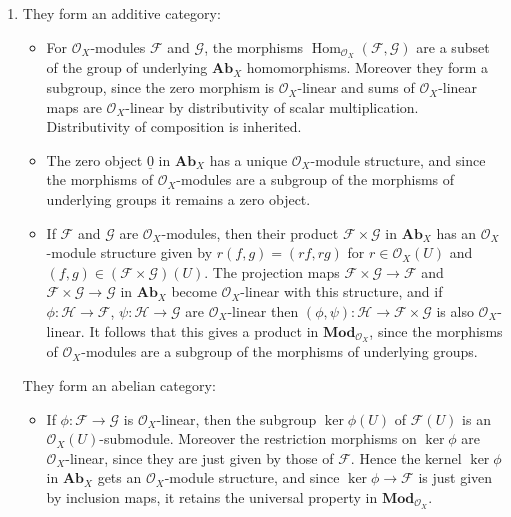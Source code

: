 \documentclass{report}
\newcommand{\cat}[1]{\mathbf{#1}} %
\newcommand{\shConst}[1]{\underline{#1}} %
\renewcommand{\O}{\mathscr{O}} %
\newcommand{\scrF}{\mathscr{F}}
\newcommand{\scrG}{\mathscr{G}}
\newcommand{\scrH}{\mathscr{H}}
\DeclareMathOperator{\Hom}{Hom}
\begin{document}
\begin{enumerate}[label=\textbf{2.6.\Alph*.}]
	\item They form an additive category:
	      \begin{itemize}
		      \item For $\O_X$-modules $\scrF$ and $\scrG$, the morphisms
		            $\Hom_{\O_X}(\scrF,\scrG)$ are a subset of the group of underlying
		            $\cat{Ab}_X$ homomorphisms. Moreover they form a subgroup, since
		            the zero morphism is $\O_X$-linear and sums of $\O_X$-linear
		            maps are $\O_X$-linear by distributivity of scalar
		            multiplication. Distributivity of composition is inherited.

		      \item The zero object $\shConst0$ in $\cat{Ab}_X$ has a unique
		            $\O_X$-module structure, and since the morphisms of
		            $\O_X$-modules are a subgroup of the morphisms of underlying
		            groups it remains a zero object.

		      \item If $\scrF$ and $\scrG$ are $\O_X$-modules, then their product
		            $\scrF\times\scrG$ in $\cat{Ab}_X$ has an $\O_X$-module structure
		            given by $r(f,g)=(rf,rg)$ for $r\in\O_X(U)$ and
		            $(f,g)\in(\scrF\times\scrG)(U)$. The projection maps $\scrF\times\scrG\to\scrF$
		            and $\scrF\times\scrG\to\scrG$ in $\cat{Ab}_X$ become $\O_X$-linear with
		            this structure, and if $\phi:\scrH\to\scrF$, $\psi:\scrH\to\scrG$ are
		            $\O_X$-linear then $(\phi,\psi):\scrH\to\scrF\times\scrG$ is also
		            $\O_X$-linear. It follows that this gives a product in
		            $\cat{Mod}_{\O_X}$, since the morphisms of $\O_X$-modules are a
		            subgroup of the morphisms of underlying groups.
	      \end{itemize}
	      They form an abelian category:
	      \begin{itemize}
		      \item If $\phi:\scrF\to\scrG$ is $\O_X$-linear, then the subgroup
		            $\ker\phi(U)$ of $\scrF(U)$ is an $\O_X(U)$-submodule. Moreover the
		            restriction morphisms on $\ker\phi$ are $\O_X$-linear, since
		            they are just given by those of $\scrF$. Hence the kernel $\ker\phi$
		            in $\cat{Ab}_X$ gets an $\O_X$-module structure, and since
		            $\ker\phi\to\scrF$ is just given by inclusion maps, it retains the
		            universal property in $\cat{Mod}_{\O_X}$.


\end{itemize}
\end{enumerate}
\end{document}
